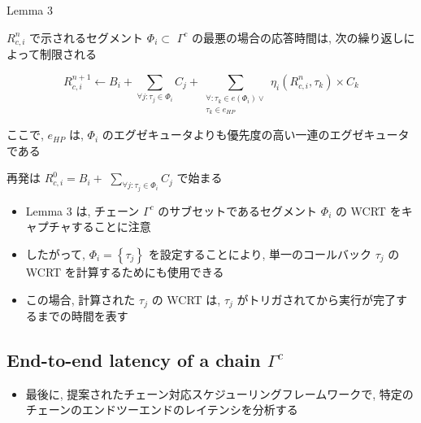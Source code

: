 \begin{frame}[label=lemma3]{Lemma 3}
    \begin{lemma}[]
        $R_{c, i}^{n}$ で示されるセグメント $\Phi_{i} \subset$  $\Gamma^{c}$ の最悪の場合の応答時間は, 次の繰り返しによって制限される

        \begin{equation*}
            R_{c, i}^{n+1} \leftarrow B_{i}+\sum_{\forall j: \tau_{j} \in \Phi_{i}} C_{j}+\sum_{\substack{\forall: \tau_{k} \in e\left(\Phi_{i}\right) \vee \\ \tau_{k} \in e_{H P}}} \eta_{i}\left(R_{c, i}^{n}, \tau_{k}\right) \times C_{k}
        \end{equation*}

        ここで, $e_{H P}$ は, $\Phi_{i}$ のエグゼキュータよりも優先度の高い一連のエグゼキュータである
        \item 再発は $R_{c, i}^{0}=B_{i}+$  $\sum_{\forall j: \tau_{j} \in \Phi_{i}} C_{j}$ で始まる
    \end{lemma}
\end{frame}

\begin{frame}{}
    \begin{itemize}
        \item Lemma 3 は, チェーン $\Gamma^{c}$ のサブセットであるセグメント $\Phi_{i}$ の WCRT をキャプチャすることに注意
        \item したがって, $\Phi_{i}=\left\{\tau_{j}\right\}$ を設定することにより, 単一のコールバック $\tau_{j}$ の WCRT を計算するためにも使用できる
        \item この場合, 計算された $\tau_{j}$ の WCRT は, $\tau_{j}$ がトリガされてから実行が完了するまでの時間を表す
    \end{itemize}
\end{frame}


\subsection{End-to-end latency of a chain $\Gamma^{c}$}
\label{ssec: end-to-end latency of a chain gamma}

\begin{frame}{}
    \begin{itemize}
        \item 最後に, 提案されたチェーン対応スケジューリングフレームワークで, 特定のチェーンのエンドツーエンドのレイテンシを分析する
    \end{itemize}
\end{frame}

